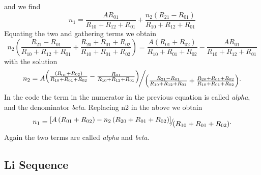 and we find
\begin{equation}
{n_1} = \frac{{A{R_{01}}}}{{{R_{10}} + {R_{12}} + {R_{01}}}} +
\frac{{{n_2}\left( {{R_{21}} - {R_{01}}} \right)}}{{{R_{10}} + {R_{12}}
+ {R_{01}}}}
\end{equation}
Equating the two and gathering terms we obtain
\begin{equation}
{n_2}\left( {\frac{{{R_{21}} - {R_{01}}}}{{{R_{10}} + {R_{12}} + {R_{01}}}}
+ \frac{{{R_{20}} + {R_{01}} + {R_{02}}}}{{{R_{10}} + {R_{01}} + {R_{02}}}}}
\right) = \frac{{A\left( {R_{01}^{} + {R_{02}}} \right)}}{{{R_{10}} +
{R_{01}} + {R_{02}}}} - \frac{{A{R_{01}}}}{{{R_{10}} + {R_{12}} +
{R_{01}}}}
\end{equation}
with the solution
\begin{equation}
{n_2} = A{\raise0.7ex\hbox{${\left( {\frac{{\left( {R_{01}^{} + {R_{02}}}
\right)}}{{{R_{10}} + {R_{01}} + {R_{02}}}} - \frac{{{R_{01}}}}{{{R_{10}}
+ {R_{12}} + {R_{01}}}}} \right)}$} \!\mathord{\left/
 {\vphantom {{\left( {\frac{{\left( {R_{01}^{} + {R_{02}}}
\right)}}{{{R_{10}} + {R_{01}} + {R_{02}}}} - \frac{{{R_{01}}}}{{{R_{10}}
+ {R_{12}} + {R_{01}}}}} \right)} {\left( {\frac{{{R_{21}} -
{R_{01}}}}{{{R_{10}} + {R_{12}} + {R_{01}}}} + \frac{{{R_{20}} + {R_{01}}
+ {R_{02}}}}{{{R_{10}} + {R_{01}} + {R_{02}}}}}
\right)}}}\right.\kern-\nulldelimiterspace}
\!\lower0.7ex\hbox{${\left( {\frac{{{R_{21}} - {R_{01}}}}{{{R_{10}} +
{R_{12}} + {R_{01}}}} + \frac{{{R_{20}} + {R_{01}} + {R_{02}}}}{{{R_{10}}
+ {R_{01}} + {R_{02}}}}} \right)}$}}
.
\end{equation}
In the code the term in the numerator in the previous equation is called
\emph{alpha}, and the denominator \emph{beta}.
Replacing n2 in the above we obtain
\begin{equation}
{n_1} = {\raise0.7ex\hbox{${\left[ {A\left( {{R_{01}} + {R_{02}}} \right)
- {n_2}\left( {{R_{20}} + {R_{01}} + {R_{02}}} \right)} \right]}$}
\!\mathord{\left/
 {\vphantom {{\left[ {A\left( {{R_{01}} + {R_{02}}} \right) - {n_2}\left(
{{R_{20}} + {R_{01}} + {R_{02}}} \right)} \right]} {\left( {{R_{10}} +
{R_{01}} + {R_{02}}} \right)}}}\right.\kern-\nulldelimiterspace}
\!\lower0.7ex\hbox{${\left( {{R_{10}} + {R_{01}} + {R_{02}}} \right)}$}} .
\end{equation}
Again the two terms are called \emph{alpha} and \emph{beta}.

\subsection{Li Sequence}

